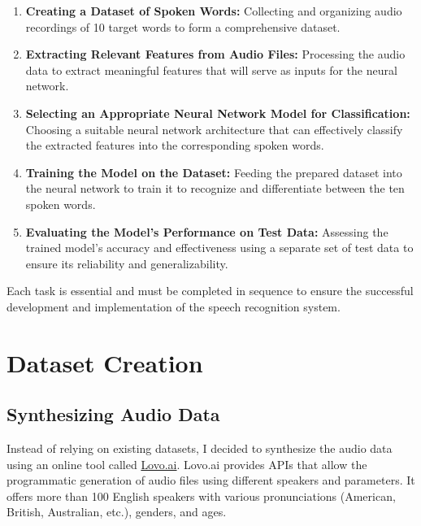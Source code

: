 \documentclass[12pt]{article}
\begin{document}
\begin{enumerate}
    \item \textbf{Creating a Dataset of Spoken Words:} Collecting and organizing audio recordings of 10 target words to form a comprehensive dataset.
    \item \textbf{Extracting Relevant Features from Audio Files:} Processing the audio data to extract meaningful features that will serve as inputs for the neural network.
    \item \textbf{Selecting an Appropriate Neural Network Model for Classification:} Choosing a suitable neural network architecture that can effectively classify the extracted features into the corresponding spoken words.
    \item \textbf{Training the Model on the Dataset:} Feeding the prepared dataset into the neural network to train it to recognize and differentiate between the ten spoken words.
    \item \textbf{Evaluating the Model's Performance on Test Data:} Assessing the trained model's accuracy and effectiveness using a separate set of test data to ensure its reliability and generalizability.
\end{enumerate}

Each task is essential and must be completed in sequence to ensure the successful development and implementation of the speech recognition system.

\newpage




\section{Dataset Creation}

\subsection{Synthesizing Audio Data}

Instead of relying on existing datasets, I decided to synthesize the audio data using an online tool called \href{https://lovo.ai}{Lovo.ai}. Lovo.ai provides APIs that allow the programmatic generation of audio files using different speakers and parameters. It offers more than 100 English speakers with various pronunciations (American, British, Australian, etc.), genders, and ages.
\end{document}
